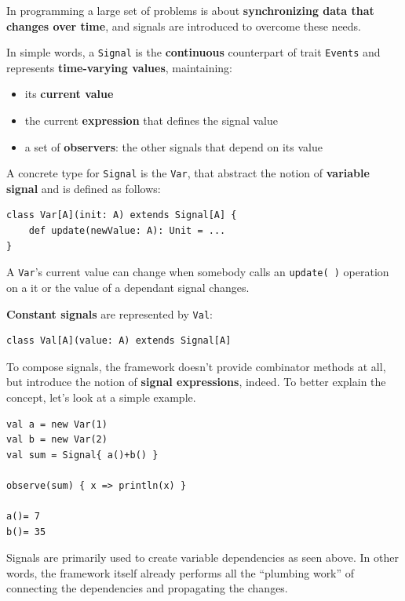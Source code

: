 In programming a large set of problems is about \textbf{synchronizing
data that changes over time}, and signals are introduced to overcome
these needs.

In simple words, a \texttt{Signal} is the \textbf{continuous}
counterpart of trait \texttt{Events} and represents \textbf{time-varying
values}, maintaining:

\begin{itemize}
\itemsep1pt\parskip0pt
\item
  its \textbf{current value}
\item
  the current \textbf{expression} that defines the signal value
\item
  a set of \textbf{observers}: the other signals that depend on its
  value
\end{itemize}

A concrete type for \texttt{Signal} is the \texttt{Var}, that abstract
the notion of \textbf{variable signal} and is defined as follows:

\begin{verbatim}
class Var[A](init: A) extends Signal[A] {
    def update(newValue: A): Unit = ...
}
\end{verbatim}

A \texttt{Var}'s current value can change when somebody calls an
\texttt{update(\ )} operation on a it or the value of a dependant signal
changes.

\textbf{Constant signals} are represented by \texttt{Val}:

\begin{verbatim}
class Val[A](value: A) extends Signal[A]
\end{verbatim}

To compose signals, the framework doesn't provide combinator methods at
all, but introduce the notion of \textbf{signal expressions}, indeed. To
better explain the concept, let's look at a simple example.

\begin{verbatim}
val a = new Var(1)
val b = new Var(2)
val sum = Signal{ a()+b() }

observe(sum) { x => println(x) }

a()= 7
b()= 35
\end{verbatim}

Signals are primarily used to create variable dependencies as seen
above. In other words, the framework itself already performs all the “plumbing work” of connecting the dependencies and propagating the changes.

